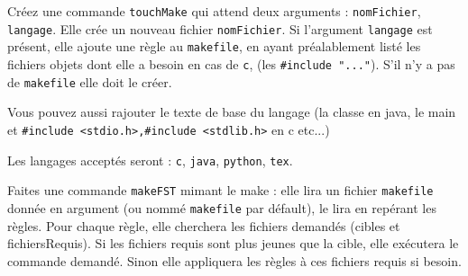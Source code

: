 \documentclass[11pt]{exam}
\begin{document}
	 Créez une commande {\tt touchMake} qui attend deux arguments : {\tt nomFichier}, {\tt langage}. Elle crée un nouveau fichier {\tt nomFichier}. Si l'argument {\tt langage} est présent, elle ajoute une règle au {\tt makefile}, en ayant préalablement listé les fichiers objets dont elle a besoin en cas de {\tt c}, (les {\tt \#include "..."}). S'il n'y a pas de {\tt makefile} elle doit le créer.
	 
	 Vous pouvez aussi rajouter le texte de base du langage (la classe en java, le main et {\tt \#include <stdio.h>,\#include <stdlib.h>} en c etc...)
	 
	 Les langages acceptés seront : {\tt c}, {\tt java}, {\tt python}, {\tt tex}.
	
	
	Faites une commande {\tt makeFST} mimant le make : elle lira un fichier {\tt makefile} donnée en argument (ou nommé {\tt makefile} par défault), le lira en repérant les règles. Pour chaque règle, elle cherchera les fichiers demandés (cibles et  fichiersRequis). Si les fichiers requis sont plus jeunes que la cible, elle exécutera le commande demandé. Sinon elle appliquera les règles à ces fichiers requis si besoin.
\end{document}
